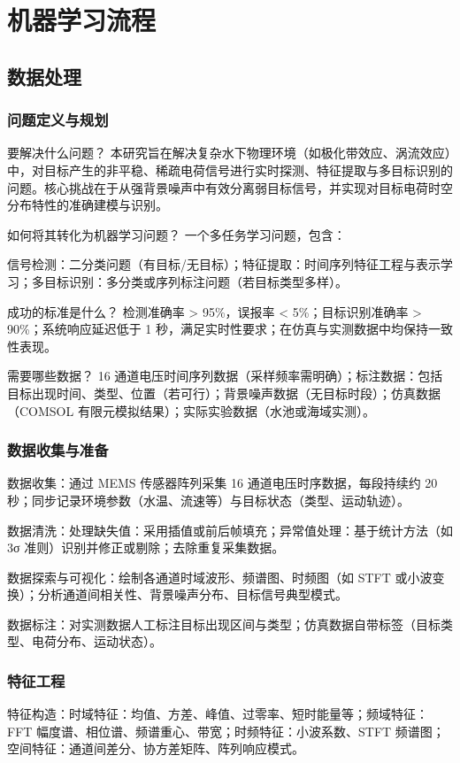 \chapter{机器学习流程}
\section{数据处理}
\subsection{问题定义与规划}
要解决什么问题？ 本研究旨在解决复杂水下物理环境（如极化带效应、涡流效应）中，对目标产生的非平稳、稀疏电荷信号进行实时探测、特征提取与多目标识别的问题。核心挑战在于从强背景噪声中有效分离弱目标信号，并实现对目标电荷时空分布特性的准确建模与识别。

如何将其转化为机器学习问题？ 一个多任务学习问题，包含：

信号检测：二分类问题（有目标/无目标）；特征提取：时间序列特征工程与表示学习；多目标识别：多分类或序列标注问题（若目标类型多样）。

成功的标准是什么？ 检测准确率 > 95\%，误报率 < 5\%；目标识别准确率 > 90\%；系统响应延迟低于 1 秒，满足实时性要求；在仿真与实测数据中均保持一致性表现。

需要哪些数据？ 16 通道电压时间序列数据（采样频率需明确）；标注数据：包括目标出现时间、类型、位置（若可行）；背景噪声数据（无目标时段）；仿真数据（COMSOL 有限元模拟结果）；实际实验数据（水池或海域实测）。

\subsection{数据收集与准备}
数据收集：通过 MEMS 传感器阵列采集 16 通道电压时序数据，每段持续约 20 秒；同步记录环境参数（水温、流速等）与目标状态（类型、运动轨迹）。

数据清洗：处理缺失值：采用插值或前后帧填充；异常值处理：基于统计方法（如 3σ 准则）识别并修正或剔除；去除重复采集数据。

数据探索与可视化：绘制各通道时域波形、频谱图、时频图（如 STFT 或小波变换）；分析通道间相关性、背景噪声分布、目标信号典型模式。

数据标注：对实测数据人工标注目标出现区间与类型；仿真数据自带标签（目标类型、电荷分布、运动状态）。

\subsection{特征工程}
特征构造：时域特征：均值、方差、峰值、过零率、短时能量等；频域特征：FFT 幅度谱、相位谱、频谱重心、带宽；时频特征：小波系数、STFT 频谱图；空间特征：通道间差分、协方差矩阵、阵列响应模式。

